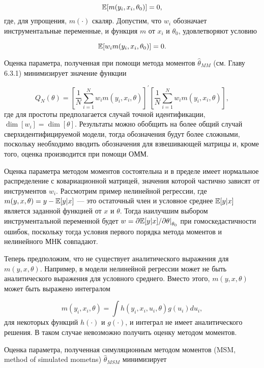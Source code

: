 \begin{equation}
\mathbb{E}[m(y_i,x_i,\theta_0)]=0,
\end{equation}
где, для упрощения, $m(\cdot)$ скаляр. Допустим, что $w_i$ обозначает инструментальные переменные, и функция $m$ от $x_i$ и $\theta_0$, удовлетворяют условию

\begin{equation}
\mathbb{E}[w_{i}m(y_i,x_i,\theta_0)]=0.
\end{equation}

Оценка параметра, полученная при помощи метода моментов $\hat{\theta}_{MM}$ (см. Главу 6.3.1) минимизирует значение функции

\begin{equation}
Q_{N}(\theta)=\left[\dfrac{1}{N}\sum^{N}_{i=1}w_{i}m(y_i,x_i,\theta)\right]^{'}\left[\dfrac{1}{N}\sum^{N}_{i=1}w_{i}m(y_i,x_i,\theta)\right],
\end{equation}
где для простоты предполагается случай точной идентификации, $\dim[w_i]=\dim[\theta]$. Результаты можно обобщить на более общий случай сверхидентифицируемой модели, тогда обозначения будут более сложными, поскольку необходимо вводить обозначения для взвешивающей матрицы и, кроме того, оценка производится при помощи ОММ.

Оценка параметра методом моментов состоятельна и в пределе имеет нормальное распределение с ковариационной матрицей, значения которой частично зависят от инструментов $w_i$. Рассмотрим пример нелинейной регрессии, где $m(y,x,\theta)=y-\mathbb{E}[y|x]$ --- это остаточный член и условное среднее $\mathbb{E}[y|x]$ является заданной функцией от $x$ и $\theta$. Тогда наилучшим выбором инструментальной переменной будет $w=\partial{\mathbb{E}[y|x]}/{\partial{\theta}}{\mid}_{\theta_0}$ при гомоскедастичности ошибок, поскольку тогда условия первого порядка метода моментов и нелинейного МНК совпадают.

Теперь предположим, что не существует аналитического выражения для $m(y,x,\theta)$. Например, в модели нелинейной регрессии может не быть аналитического выражения для условного среднего. Вместо этого, $m(y,x,\theta)$ может быть выражено интегралом

\begin{equation}
m(y_i,x_i,\theta)=\int{h(y_i,x_i,u_i,\theta)g(u_i)du_i},
\end{equation}
для некоторых функций $h(\cdot)$ и $g(\cdot)$, и интеграл  не имеет аналитического решения. В таком случае невозможно получить оценку методом моментов.

Оценка параметра, полученная симуляционным методом моментов (MSM, method of simulated mometns) $\hat{\theta}_{MSM}$ минимизирует

